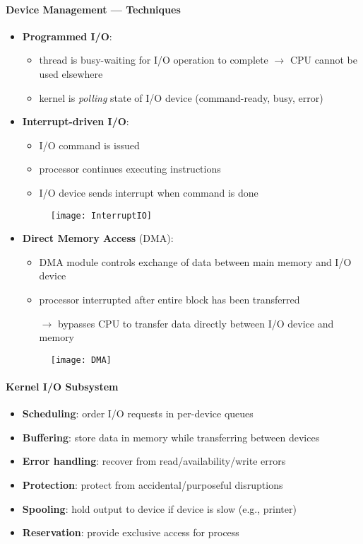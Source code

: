 \paragraph{Device Management --- Techniques}
\begin{itemize}
  \item \textbf{Programmed I/O}:
  \begin{itemize}
    \item thread is busy-waiting for I/O operation to complete $ \to $ CPU cannot be used elsewhere 
    \item kernel is \emph{polling} state of I/O device (command-ready, busy, error)
  \end{itemize}
  \item \textbf{Interrupt-driven I/O}:
  \begin{itemize}
    \item I/O command is issued 
    \item processor continues executing instructions 
    \item I/O device sends interrupt when command is done
  \end{itemize}
  \begin{figure}[h]\centering\label{InterruptIO}\texttt{[image: InterruptIO]}\end{figure}
  \item \textbf{Direct Memory Access} (DMA):
  \begin{itemize}
    \item DMA module controls exchange of data between main memory and I/O device 
    \item processor interrupted after entire block has been transferred 
    \item[$ \to $] bypasses CPU to transfer data directly between I/O device and memory
  \end{itemize}
  \begin{figure}[h]\centering\label{DMA}\texttt{[image: DMA]}\end{figure}
\end{itemize}

\paragraph{Kernel I/O Subsystem}
\begin{itemize}
  \item \textbf{Scheduling}: order I/O requests in per-device queues
  \item \textbf{Buffering}: store data in memory while transferring between devices
  \item \textbf{Error handling}: recover from read/availability/write errors
  \item \textbf{Protection}: protect from accidental/purposeful disruptions
  \item \textbf{Spooling}: hold output to device if device is slow (e.g., printer)
  \item \textbf{Reservation}: provide exclusive access for process
\end{itemize}

